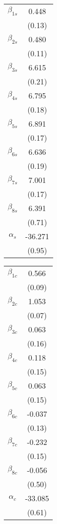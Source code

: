 \documentclass{article}
\begin{document}
\begin{tabular}{c|c||}


            
$\beta_{1s}$ & 0.448  \\
            &(0.13)    \\
$\beta_{2s} $& 0.480  \\
            &(0.11)  \\
$\beta_{3s} $& 6.615  \\
            &(0.21)  \\
$\beta_{4s} $& 6.795  \\
            &(0.18)  \\
$\beta_{5s} $& 6.891  \\
            &(0.17)  \\
$\beta_{6s} $& 6.636  \\
            &(0.19)  \\
$\beta_{7s} $& 7.001  \\
            &(0.17)  \\
$\beta_{8s} $& 6.391  \\
            &(0.71)  \\
$\alpha_s $& -36.271  \\
        &(0.95)    \\
        \end{tabular}
        \begin{tabular}{c|c|}
$\beta_{1c}$ & 0.566 \\
            &(0.09)  \\
$\beta_{2c}$ & 1.053  \\
            &(0.07) \\
$\beta_{3c}$ & 0.063 \\
            &(0.16)  \\
$\beta_{4c}$ & 0.118  \\
            &(0.15) \\
$\beta_{5c}$ & 0.063 \\
            &(0.15)  \\
$\beta_{6c}$ & -0.037  \\
            &(0.13) \\
$\beta_{7c}$ & -0.232 \\
            &(0.15)  \\
$\beta_{8c}$ & -0.056  \\
            &(0.50) \\
$\alpha_c$ & -33.085 \\
        &(0.61)  \\
\end{tabular}\\
\end{document}
